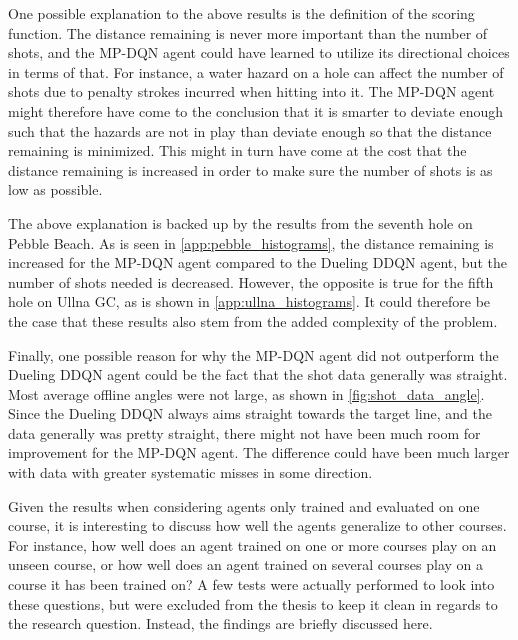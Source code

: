 \documentclass{kththesis}
\begin{document}
One possible explanation to the above results is the definition of the scoring function. The distance remaining is never more important than the number of shots, and the MP-DQN agent could have learned to utilize its directional choices in terms of that. For instance, a water hazard on a hole can affect the number of shots due to penalty strokes incurred when hitting into it. The MP-DQN agent might therefore have come to the conclusion that it is smarter to deviate enough such that the hazards are not in play than deviate enough so that the distance remaining is minimized. This might in turn have come at the cost that the distance remaining is increased in order to make sure the number of shots is as low as possible. 

The above explanation is backed up by the results from the seventh hole on Pebble Beach. As is seen in \autoref{app:pebble_histograms}, the distance remaining is increased for the MP-DQN agent compared to the Dueling DDQN agent, but the number of shots needed is decreased. However, the opposite is true for the fifth hole on Ullna GC, as is shown in \autoref{app:ullna_histograms}. It could therefore be the case that these results also stem from the added complexity of the problem.

Finally, one possible reason for why the MP-DQN agent did not outperform the Dueling DDQN agent could be the fact that the shot data generally was straight. Most average offline angles were not large, as shown in \autoref{fig:shot_data_angle}. Since the Dueling DDQN always aims straight towards the target line, and the data generally was pretty straight, there might not have been much room for improvement for the MP-DQN agent. The difference could have been much larger with data with greater systematic misses in some direction.

Given the results when considering agents only trained and evaluated on one course, it is interesting to discuss how well the agents generalize to other courses. For instance, how well does an agent trained on one or more courses play on an unseen course, or how well does an agent trained on several courses play on a course it has been trained on? A few tests were actually performed to look into these questions, but were excluded from the thesis to keep it clean in regards to the research question. Instead, the findings are briefly discussed here.
\end{document}
